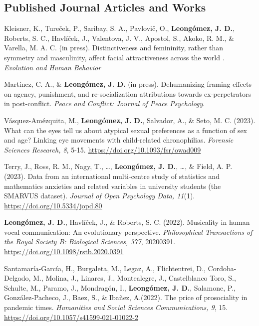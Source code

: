 \documentclass[11pt,a4paper,]{awesome-cv}
\begin{document}
\hypertarget{section}{%
\subsection{\texorpdfstring{\textbf{Published Journal Articles and Works}}{}}\label{section}}

\begingroup
\footnotesize
\setlength{\parindent}{-0.5in}
\setlength{\leftskip}{0.5in}

Kleisner, K., Tureček, P., Saribay, S. A., Pavlovič, O.,
\textbf{Leongómez, J. D.}, Roberts, S. C., Havlíček, J., Valentova, J.
V., Apostol, S., Akoko, R. M., \& Varella, M. A. C. (in press).
Distinctiveness and femininity, rather than symmetry and masculinity,
affect facial attractiveness across the world . \emph{Evolution and
Human Behavior}

Martínez, C. A., \& \textbf{Leongómez, J. D.} (in press). Dehumanizing
framing effects on agency, punishment, and re-socialization attributions
towards ex-perpetrators in post-conflict. \emph{Peace and Conflict:
Journal of Peace Psychology}.

Vásquez-Amézquita, M., \textbf{Leongómez, J. D.}, Salvador, A., \& Seto,
M. C. (2023). What can the eyes tell us about atypical sexual
preferences as a function of sex and age? Linking eye movements with
child-related chronophilias. \emph{Forensic Sciences Research, 8}, 5-15.
\url{https://doi.org/10.1093/fsr/owad009}

Terry, J., Ross, R. M., Nagy, T., \ldots, \textbf{Leongómez, J. D.},
\ldots, \& Field, A. P. (2023). Data from an international multi-centre
study of statistics and mathematics anxieties and related variables in
university students (the SMARVUS dataset). \emph{Journal of Open
Psychology Data, 11}(1). \url{https://doi.org/10.5334/jopd.80}

\textbf{Leongómez, J. D.}, Havlíček, J., \& Roberts, S. C. (2022).
Musicality in human vocal communication: An evolutionary perspective.
\emph{Philosophical Transactions of the Royal Society B: Biological
Sciences, 377}, 20200391. \url{https://doi.org/10.1098/rstb.2020.0391}

Santamaría-García, H., Burgaleta, M., Legaz, A., Flichtentrei, D.,
Cordoba-Delgado, M., Molina, J., Linares, J., Montealegre, J.,
Castelblanco Toro, S., Schulte, M., Paramo, J., Mondragón, I.,
\textbf{Leongómez, J. D.}, Salamone, P., González‑Pacheco, J., Baez, S.,
\& Ibañez, A.(2022). The price of prosociality in pandemic times.
\emph{Humanities and Social Sciences Communications, 9}, 15.
\url{https://doi.org/10.1057/s41599-021-01022-2}
\end{document}
